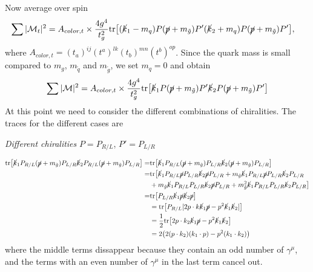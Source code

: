 \documentclass[11pt]{article}
\begin{document}
Now average over spin
\begin{align*}
\sum |\mathcal{M}_t|^2 &=A_{color, t} \times  \frac{4 g^4}{t_g^2} \text{tr} \big[
(\cancel{k}_1 - m_q)  P (\cancel{p} + m_{\tilde{g}}) P' (\cancel{k}_2 + m_q)  P (\cancel{p} + m_{\tilde{g}}) P' \big],
\end{align*}
where $A_{color, t}= (t_a)^{ij} (t^a)^{lk} (t_b)^{mn} (t^b)^{op}$. Since the quark mass is small compared to $m_g$, $m_{\tilde{q}}$ and $m_{\tilde{g}}$, we set $m_q=0$ and obtain
\begin{align*}
\sum |\mathcal{M}|^2 &= A_{color, t} \times \frac{4 g^4}{t_g^2} \text{tr} \big[ 
\cancel{k}_1 P (\cancel{p} + m_{\tilde{g}}) P' \cancel{k}_2 P (\cancel{p} + m_{\tilde{g}}) P' \big]\\
\end{align*}
At this point we need to consider the different combinations of chiralities. The traces for the different cases are
\begin{center}
\textit{Different chiralities }$P=P_{R/L}$, $P'=P_{L/R}$
\end{center}
\begin{align*}
\text{tr} \big[ 
\cancel{k}_1 P_{R/L} (\cancel{p} + m_{\tilde{g}}) P_{L/R} \cancel{k}_2 P_{R/L} (\cancel{p} + m_{\tilde{g}}) P_{L/R} \big]=& \text{tr} \big[ 
\cancel{k}_1 P_{R/L} (\cancel{p} + m_{\tilde{g}}) P_{L/R} \cancel{k}_2(\cancel{p} + m_{\tilde{g}}) P_{L/R} \big] \\
=& \text{tr} \big[ 
\cancel{k}_1 P_{R/L} \cancel{p} P_{L/R} \cancel{k}_2 \cancel{p} P_{L/R}
+ m_{\tilde{g}} \cancel{k}_1 P_{R/L} \cancel{p} P_{L/R} \cancel{k}_2  P_{L/R}\\
&+ m_{\tilde{g}} \cancel{k}_1 P_{R/L}  P_{L/R} \cancel{k}_2\cancel{p} P_{L/R}
+ m_{\tilde{g}}^2 \cancel{k}_1 P_{R/L} P_{L/R} \cancel{k}_2  P_{L/R} \big]\\
=& \text{tr} \big[ P_{L/R} 
\cancel{k}_1 \cancel{p} \cancel{k}_2 \cancel{p}  \big]\\
&= \text{tr} \big[
 P_{R/L}[2 p \cdot k \cancel{k}_1 \cancel{p} - p^2\cancel{k}_1 \cancel{k}_2 ]  \big]\\
 &=\frac{1}{2} \text{tr} \big[
2 p \cdot k_2 \cancel{k}_1 \cancel{p} - p^2\cancel{k}_1 \cancel{k}_2 \big]\\
&= 2 \big(
2 (p \cdot k_2) (k_1 \cdot p) - p^2 (k_1 \cdot k_2)\big)
\end{align*}
where the middle terms dissappear because they contain an odd number of $\gamma^{\mu}$, and the terms with an even number of $\gamma^{\mu}$ in the last term cancel out.
\end{document}
